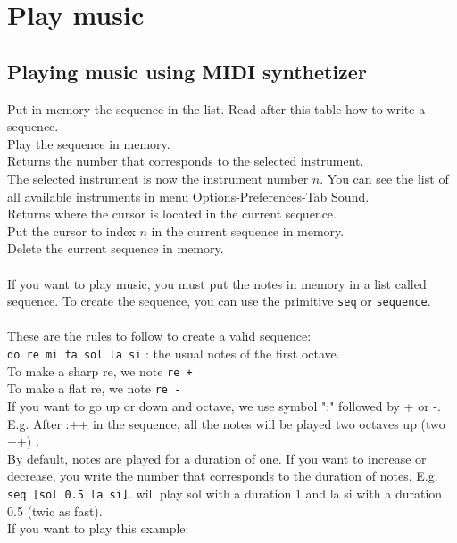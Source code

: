 \section{Play music}
\subsection{Playing music using MIDI synthetizer}
\noindent 
{}
Put in memory the sequence in the list. Read after this table how to write a sequence.\\
Play the sequence in memory. \\
Returns the number that corresponds to the selected instrument.  \\
The selected instrument is now the instrument number $n$. You can see the list of all available instruments in menu Options-Preferences-Tab Sound.\\
Returns where the cursor is located in the current sequence.\\
Put the cursor to index $n$ in the current sequence in memory.\\
Delete the current sequence in memory. \\ \\ 
If you want to play music, you must put the notes in memory in a list called sequence. To create the sequence, you can use the primitive \texttt{seq} or \texttt{sequence}.\\ \\
 These are the rules to follow to create a valid sequence:\\
\texttt{do re mi fa sol la si} : the usual notes of the first octave.\\
To make a sharp re, we note \texttt{re +}\\
To make a flat re, we note \texttt{re -}\\
If you want to go up or down and octave, we use symbol ":" followed by + or -. E.g. After :++ in the sequence, all the notes will be played two octaves up (two ++)
. \\
By default, notes are played for a duration of one. If you want to increase or decrease, you write the number that corresponds to the duration of notes. E.g. \texttt{seq [sol 0.5 la si]}. will play sol with a duration 1 and la si with a duration 0.5 (twic as fast).\\
If you want to play this example:\\
